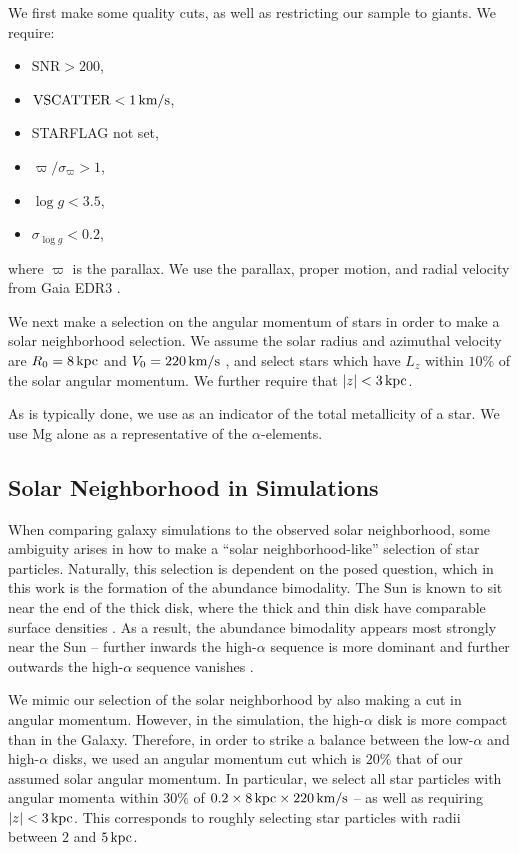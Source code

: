 We first make some quality cuts, as well as restricting our sample to giants. We require:
\begin{itemize}[noitemsep]
    \item $\textrm{SNR} > 200$,
    \item $\textrm{VSCATTER} < 1\,\textrm{km}/\textrm{s}$,
    \item STARFLAG not set,
    \item $\varpi/\sigma_{\varpi} > 1$,
    \item $\log{g} < 3.5$,
    \item $\sigma_{\log{g}} < 0.2$,
\end{itemize}
where $\varpi$ is the parallax. We use the parallax, proper motion, and radial velocity from Gaia EDR3 \citep{2016AA...595A...1G,2021AA...649A...1G,2021AA...649A...2L,2021AA...653A.160S}.

We next make a selection on the angular momentum of stars in order to make a solar neighborhood selection. We assume the solar radius and azimuthal velocity are $R_0=8\,\textrm{kpc}$ and $V_0=220\,\textrm{km}/\textrm{s}$ \citep{2016ARA&A..54..529B}, and select stars which have $L_z$ within $10\%$ of the solar angular momentum. We further require that $\left|z\right| < 3\,\textrm{kpc}$.

As is typically done, we use \FeH{} as an indicator of the total metallicity of a star. We use Mg alone as a representative of the $\alpha$-elements.

\subsection{Solar Neighborhood in Simulations}\label{ssec:solarneigh}
When comparing galaxy simulations to the observed solar neighborhood, some ambiguity arises in how to make a ``solar neighborhood-like'' selection of star particles. Naturally, this selection is dependent on the posed question, which in this work is the formation of the abundance bimodality. The Sun is known to sit near the end of the thick disk, where the thick and thin disk have comparable surface densities \citep[the ratio of thick-to-thin is $\sim12\%$][]{2016ARA&A..54..529B}. As a result, the abundance bimodality appears most strongly near the Sun -- further inwards the high-$\alpha$ sequence is more dominant and further outwards the high-$\alpha$ sequence vanishes \citep[e.g.,][]{2015ApJ...808..132H}.

We mimic our selection of the solar neighborhood by also making a cut in angular momentum. However, in the simulation, the high-$\alpha$ disk is more compact than in the Galaxy. Therefore, in order to strike a balance between the low-$\alpha$ and high-$\alpha$ disks, we used an angular momentum cut which is $20\%$ that of our assumed solar angular momentum. In particular, we select all star particles with angular momenta within $30\%$ of $0.2\times8\,\textrm{kpc}\times220\,\textrm{km}/\textrm{s}$ -- as well as requiring $\left| z \right| < 3\,\textrm{kpc}$. This corresponds to roughly selecting star particles with radii between $2$ and $5\,\textrm{kpc}$.
